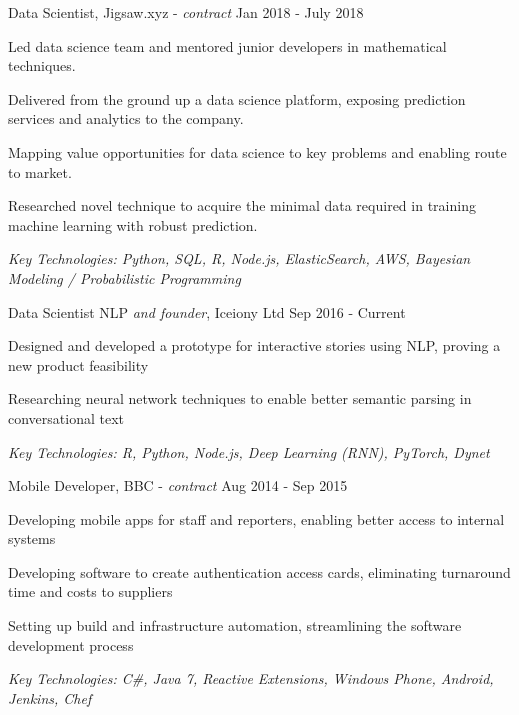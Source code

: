 \documentclass[11pt,article,oneside]{memoir}
\newenvironment{itemize*}{%
  \renewcommand\labelitemi{\textbullet}
  \footnotesize
  \begin{itemize}%
    \setlength{\itemsep}{0pt}}%
  {\end{itemize}
}
\begin{document}
\normalsize
\medskip
\ind Data Scientist, Jigsaw.xyz - \emph{contract} \hfill Jan 2018 - July 2018
\begin{itemize*}
  \item Led data science team and mentored junior developers in mathematical techniques.
  \item Delivered from the ground up a data science platform, exposing prediction services and analytics to the company.
  \item Mapping value opportunities for data science to key problems and enabling route to market.
  \item Researched novel technique to acquire the minimal data required in training machine learning with robust prediction.  
\end{itemize*}
\ind \hspace{0.35in} \footnotesize \emph{Key Technologies: Python, SQL, R, Node.js, ElasticSearch, AWS, Bayesian Modeling / Probabilistic Programming}

\normalsize
\medskip
\ind Data Scientist NLP \emph{and founder}, Iceiony Ltd \hfill Sep 2016 - Current
\begin{itemize*}
  \item Designed and developed a prototype for interactive stories using NLP, proving a new product feasibility 
  \item Researching neural network techniques to enable better semantic parsing in conversational text 
\end{itemize*}
\ind \hspace{0.35in} \footnotesize \emph{Key Technologies: R, Python, Node.js, Deep Learning (RNN), PyTorch, Dynet}

\normalsize
\medskip
\ind Mobile Developer, BBC - \emph{contract} \hfill Aug 2014 - Sep 2015
\begin{itemize*}
  \item Developing mobile apps for staff and reporters, enabling better access to internal systems
  \item Developing software to create authentication access cards, eliminating turnaround time and costs to suppliers
  \item Setting up build and infrastructure automation, streamlining the software development process
\end{itemize*}
\ind \hspace{0.35in} \footnotesize \emph{Key Technologies: C\#, Java 7, Reactive Extensions, Windows Phone, Android, Jenkins, Chef}
\end{document}
